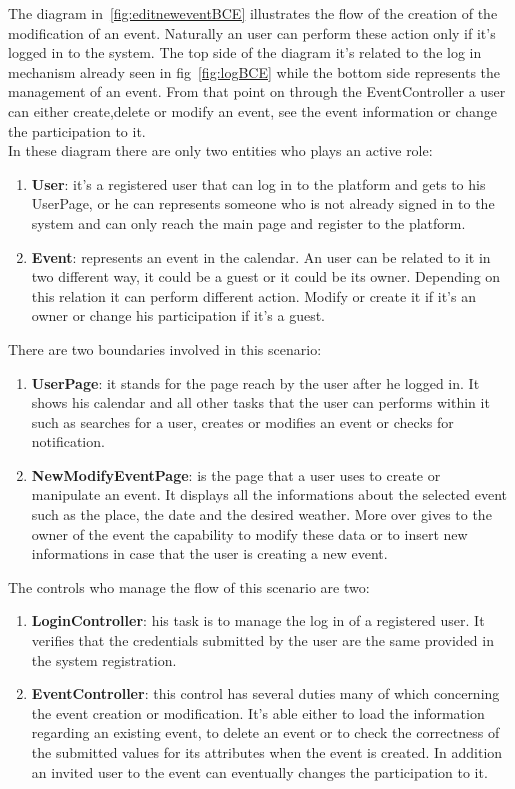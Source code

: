 The diagram in~\ref{fig:editneweventBCE} illustrates the flow of the creation of the modification of an event. Naturally an user can perform these action only if it's logged in to the system. The top side of the diagram it's related to the log in mechanism already seen in fig~\ref{fig:logBCE} while the bottom side represents the management of an event. From that point on through the EventController a user can either create,delete or modify an event, see the event information or change the participation to it.
\\In these diagram there are only two entities who plays an active role:
\begin{enumerate}
\item {\bf User}: it's a registered user that can log in to the platform and gets to his UserPage, or he can represents someone who is not already signed in to the system and can only reach the main page and register to the platform.
\item {\bf Event}: represents an event in the calendar. An user can be related to it in two different way, it could be a guest or it could be its owner. Depending on this relation it can perform different action. Modify or create it if it's an owner or change his participation if it's a guest.
\end{enumerate}
There are two boundaries involved in this scenario: \begin{enumerate}
\item {\bf UserPage}: it stands for the page reach by the user after he logged in. It shows his calendar and all other tasks that the user can performs within it such as searches for a user, creates or modifies an event or checks for notification.
\item {\bf NewModifyEventPage}: is the page that a user uses to create or manipulate an event. It displays all the informations about the selected event such as the place, the date and the desired weather. More over gives to the owner of the event the capability to modify these data or to insert new informations in case that the user is creating a new event.
 \end{enumerate}
The controls who manage the flow of this scenario are two:\begin{enumerate}
\item {\bf LoginController}: his task is to manage the log in of a registered user. It verifies that the credentials submitted by the user are the same provided in the system registration.  
\item {\bf EventController}: this control has several duties many of which concerning the event creation or modification. It's able either to load the information regarding an existing event, to delete an event or to check the correctness of the submitted values for its attributes when the event is created. In addition an invited user to the event can eventually changes the participation to it.
\end{enumerate}
